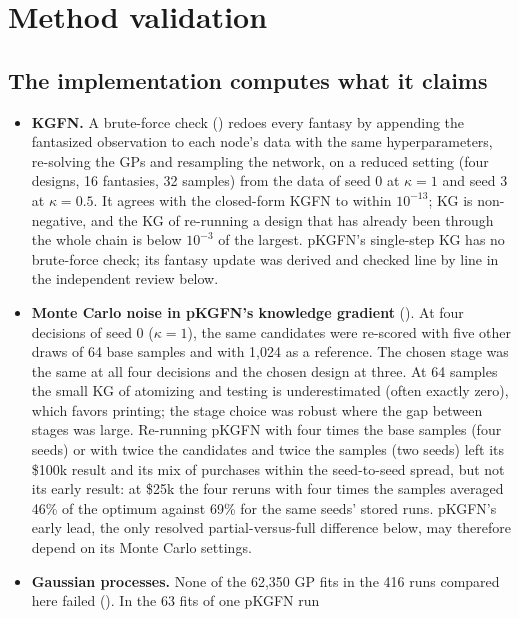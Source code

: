 \documentclass[11pt]{article}
\begin{document}
\section*{Method validation}

\subsection*{The implementation computes what it claims}

\begin{itemize}[leftmargin=*]
\item \textbf{KGFN.} A brute-force check () redoes
every fantasy by appending the fantasized observation to each node's data with
the same hyperparameters, re-solving the GPs and resampling the network, on a
reduced setting (four designs, 16 fantasies, 32 samples) from the data of seed 0
at $\kappa=1$ and seed 3 at $\kappa=0.5$. It agrees with the closed-form KGFN to
within $10^{-13}$; KG is non-negative, and the KG of re-running a design that has
already been through the whole chain is below $10^{-3}$ of the largest. pKGFN's
single-step KG has no brute-force check; its fantasy update was derived and
checked line by line in the independent review below.
\item \textbf{Monte Carlo noise in pKGFN's knowledge gradient}
(). At four decisions of seed 0 ($\kappa=1$), the same
candidates were re-scored with five other draws of 64 base samples and with
1,024 as a reference. The chosen stage was the same at all four decisions and
the chosen design at three. At 64 samples the small KG of atomizing and testing
is underestimated (often exactly zero), which favors printing; the stage choice
was robust where the gap between stages was large. Re-running pKGFN with four
times the base samples (four seeds) or with twice the candidates and twice the
samples (two seeds) left its \$100k result and its mix of purchases within the
seed-to-seed spread, but not its early result: at \$25k the four reruns with four
times the samples averaged 46\% of the optimum against 69\% for the same seeds'
stored runs. pKGFN's early lead, the only resolved partial-versus-full difference
below, may therefore depend on its Monte Carlo settings.
\item \textbf{Gaussian processes.} None of the 62,350 GP fits in the 416 runs
compared here failed (). In the 63 fits of one pKGFN run

\end{itemize}
\end{document}
